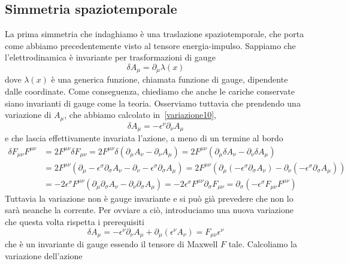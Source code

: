 \subsection{Simmetria spaziotemporale}
    La prima simmetria che indaghiamo è una traslazione spaziotemporale, che porta come abbiamo precedentemente visto al tensore energia-impulso. Sappiamo che l'elettrodinamica è invariante per trasformazioni di gauge 
\begin{equation*}
    \delta A_\mu = \partial_\mu \lambda(x)
\end{equation*}
    dove $\lambda(x)$ è una generica funzione, chiamata funzione di gauge, dipendente dalle coordinate. Come conseguenza, chiediamo che anche le cariche conservate siano invarianti di gauge come la teoria. Osserviamo tuttavia che prendendo una variazione di $A_\mu$, che abbiamo calcolato in~\eqref{variazione10}, 
\begin{equation*}
    \delta A_\mu = - \epsilon^\nu \partial_\nu A_\mu
\end{equation*}
    e che lascia effettivamente invariata l'azione, a meno di un termine al bordo
\begin{equation*}
\begin{aligned}
    \delta F_{\mu\nu} F^{\mu\nu} & = 2 F^{\mu\nu} \delta F_{\mu\nu} = 2 F^{\mu\nu} \delta (\partial_\mu A_\nu - \partial_\nu A_\mu) = 2 F^{\mu\nu} ( \partial_\mu \delta A_\nu - \partial_\nu \delta A_\mu) \\ & = 2 F^{\mu\nu} ( \partial_\mu - \epsilon^\sigma \partial_\sigma A_\nu - \partial_\nu - \epsilon^\sigma \partial_\sigma A_\mu) = 2 F^{\mu\nu} ( \partial_\mu (- \epsilon^\sigma \partial_\sigma A_\nu) - \partial_\nu (- \epsilon^\sigma \partial_\sigma A_\mu)) \\ & = - 2 \epsilon^\sigma F^{\mu\nu} ( \partial_\mu \partial_\sigma A_\nu - \partial_\nu \partial_\sigma A_\mu) = - 2 \epsilon^\sigma F^{\mu\nu} \partial_\sigma F_{\mu\nu} = \partial_\sigma (-\epsilon^\sigma F_{\mu\nu} F^{\mu\nu})
\end{aligned}
\end{equation*}
    Tuttavia la variazione non è gauge invariante e si può già prevedere che non lo sarà neanche la corrente. Per ovviare a ciò, introduciamo una nuova variazione che questa volta rispetta i prerequisiti 
\begin{equation*}
    \delta A_\mu = - \epsilon^\nu \partial_\nu A_\mu + \partial_\mu (\epsilon^\nu A_\nu) = F_{\mu\nu} \epsilon^\nu
\end{equation*}
    che è un invariante di gauge essendo il tensore di Maxwell $F$ tale. Calcoliamo la variazione dell'azione
